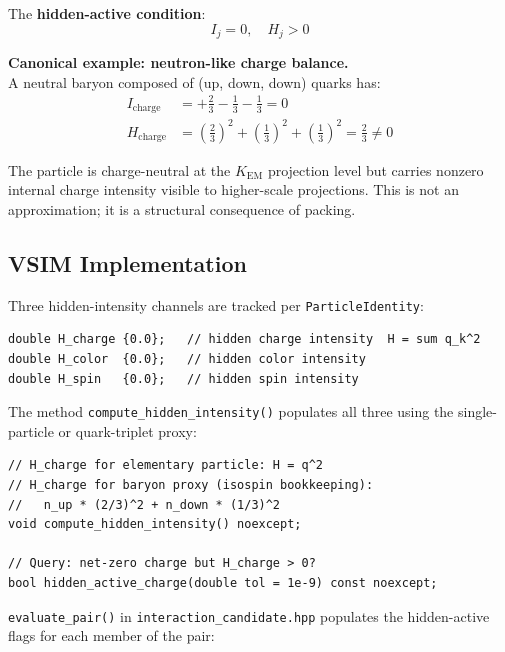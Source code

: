 \documentclass[11pt, a4paper, oneside]{article}
\theoremstyle{definition}
\theoremstyle{remark}
\begin{document}
The \textbf{hidden-active condition}:
\begin{equation}
  \boxed{I_j = 0, \quad H_j > 0}
  \label{eq:hidden-active}
\end{equation}

\textbf{Canonical example: neutron-like charge balance.}\\
A neutral baryon composed of (up, down, down) quarks has:
\begin{align}
  I_\text{charge}
	&= +\tfrac{2}{3} - \tfrac{1}{3} - \tfrac{1}{3} = 0 \label{eq:neutron-Ij} \\
  H_\text{charge}
	&= \left(\tfrac{2}{3}\right)^2
	 + \left(\tfrac{1}{3}\right)^2
	 + \left(\tfrac{1}{3}\right)^2
	 = \tfrac{2}{3} \neq 0 \label{eq:neutron-Hj}
\end{align}

The particle is charge-neutral at the $K_\text{EM}$ projection level but
carries nonzero internal charge intensity visible to higher-scale projections.
This is not an approximation; it is a structural consequence of packing.

\subsection{VSIM Implementation}

Three hidden-intensity channels are tracked per \texttt{ParticleIdentity}:

\begin{lstlisting}[caption={Hidden intensity fields in particle\_identity.hpp}]
double H_charge {0.0};   // hidden charge intensity  H = sum q_k^2
double H_color  {0.0};   // hidden color intensity
double H_spin   {0.0};   // hidden spin intensity
\end{lstlisting}

The method \texttt{compute\_hidden\_intensity()} populates all three using the
single-particle or quark-triplet proxy:

\begin{lstlisting}[caption={compute\_hidden\_intensity() key logic}]
// H_charge for elementary particle: H = q^2
// H_charge for baryon proxy (isospin bookkeeping):
//   n_up * (2/3)^2 + n_down * (1/3)^2
void compute_hidden_intensity() noexcept;

// Query: net-zero charge but H_charge > 0?
bool hidden_active_charge(double tol = 1e-9) const noexcept;
\end{lstlisting}

\texttt{evaluate\_pair()} in \texttt{interaction\_candidate.hpp} populates the
hidden-active flags for each member of the pair:
\end{document}
